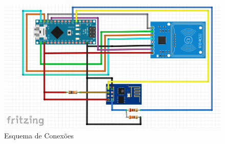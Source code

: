 \begin{figure}[H]
              \caption{\label{fig:esq_conexoes}{Esquema de Conexões}}
              \centering
              \includegraphics[width=1\textwidth]{Figuras/esquema_de_conexoes2.PNG}
\end{figure}
